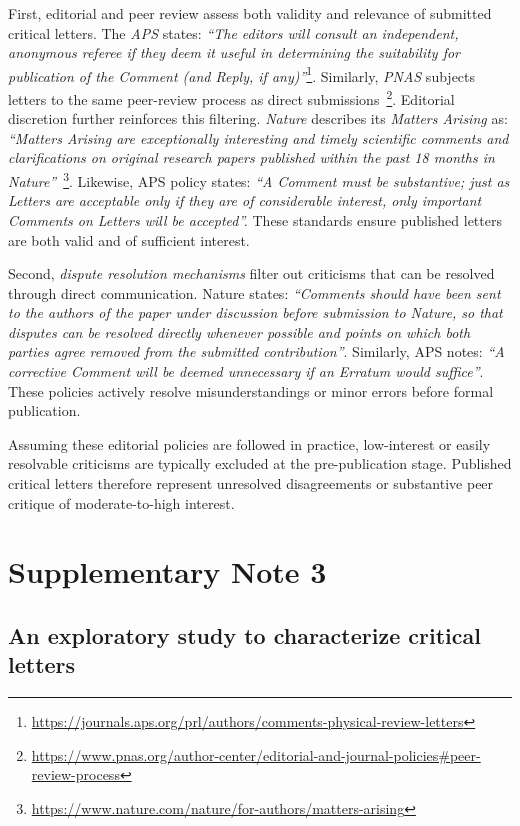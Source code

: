 \documentclass[12pt]{article} %
\begin{document}
First, editorial and peer review assess both validity and relevance of submitted critical letters. The \textit{APS} states: \textit{``The editors will consult an independent, anonymous referee if they deem it useful in determining the suitability for publication of the Comment (and Reply, if any)''}\footnote{\url{https://journals.aps.org/prl/authors/comments-physical-review-letters}}. Similarly, \textit{PNAS} subjects letters to the same peer-review process as direct submissions~\footnote{\url{https://www.pnas.org/author-center/editorial-and-journal-policies\#peer-review-process}}. Editorial discretion further reinforces this filtering. \textit{Nature} describes its \textit{Matters Arising} as: \textit{``Matters Arising are exceptionally interesting and timely scientific comments and clarifications on original research papers published within the past 18 months in Nature''}~\footnote{\url{https://www.nature.com/nature/for-authors/matters-arising}}. Likewise, APS policy states: \textit{``A Comment must be substantive; just as Letters are acceptable only if they are of considerable interest, only important Comments on Letters will be accepted''.} These standards ensure published letters are both valid and of sufficient interest.

Second, \textit{dispute resolution mechanisms} filter out criticisms that can be resolved through direct communication. Nature states: \textit{``Comments should have been sent to the authors of the paper under discussion before submission to Nature, so that disputes can be resolved directly whenever possible and points on which both parties agree removed from the submitted contribution''}. Similarly, APS notes: \textit{``A corrective Comment will be deemed unnecessary if an Erratum would suffice''}. These policies actively resolve misunderstandings or minor errors before formal publication.

Assuming these editorial policies are followed in practice, low-interest or easily resolvable criticisms are typically excluded at the pre-publication stage. Published critical letters therefore represent unresolved disagreements or substantive peer critique of moderate-to-high interest.
    

\section*{Supplementary Note 3}
\label{si:text:exploratory-annotation}
\subsection*{An exploratory study to characterize critical letters}
\end{document}
